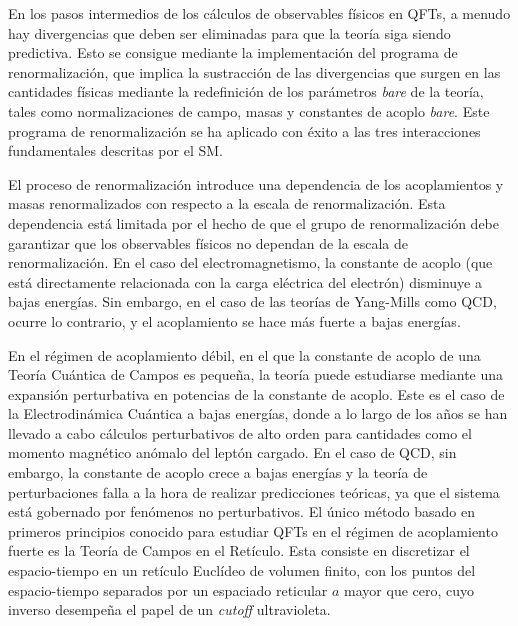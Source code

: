 En los pasos intermedios de los cálculos de observables físicos en QFTs, a menudo hay divergencias que deben ser eliminadas para que la teoría siga siendo predictiva. Esto se consigue mediante la implementación del programa de renormalización, que implica la sustracción de las divergencias que surgen en las cantidades físicas mediante la redefinición de los parámetros \textit{bare} de la teoría, tales como normalizaciones de campo, masas y constantes de acoplo \textit{bare}. Este programa de renormalización se ha aplicado con éxito a las tres interacciones fundamentales descritas por el SM.

El proceso de renormalización introduce una dependencia de los acoplamientos y masas renormalizados con respecto a la escala de renormalización. Esta dependencia está limitada por el hecho de que el grupo de renormalización debe garantizar que los observables físicos no dependan de la escala de renormalización.  En el caso del electromagnetismo, la constante de acoplo (que está directamente relacionada con la carga eléctrica del electrón) disminuye a bajas energías. Sin embargo, en el caso de las teorías de Yang-Mills como QCD, ocurre lo contrario, y el acoplamiento se hace más fuerte a bajas energías. 

En el régimen de acoplamiento débil, en el que la constante de acoplo de una Teoría Cuántica de Campos es pequeña, la teoría puede estudiarse mediante una expansión perturbativa en potencias de la constante de acoplo. Este es el caso de la Electrodinámica Cuántica a bajas energías, donde a lo largo de los años se han llevado a cabo cálculos perturbativos de alto orden para cantidades como el momento magnético anómalo del leptón cargado. En el caso de QCD, sin embargo, la constante de acoplo crece a bajas energías y la teoría de perturbaciones falla a la hora de realizar predicciones teóricas, ya que el sistema está gobernado por fenómenos no perturbativos. El único método basado en primeros principios conocido para estudiar QFTs en el régimen de acoplamiento fuerte es la Teoría de Campos en el Retículo. Esta consiste en discretizar el espacio-tiempo en un retículo Euclídeo de volumen finito, con los puntos del espacio-tiempo separados por un espaciado reticular $a$ mayor que cero, cuyo inverso desempeña el papel de un \textit{cutoff} ultravioleta. 



